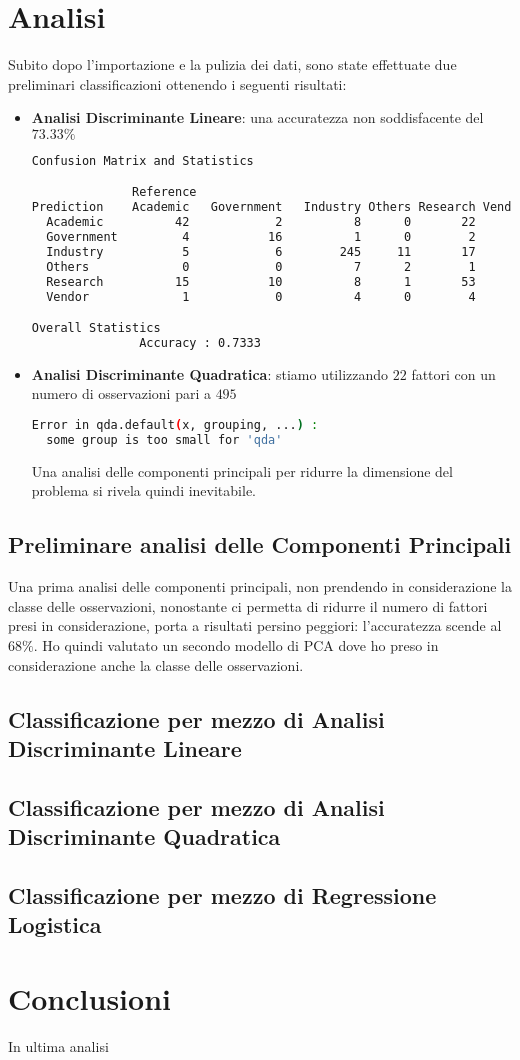 \documentclass[11pt,a4paper]{article}
\begin{document}
\section{Analisi}
Subito dopo l'importazione e la pulizia dei dati, sono state effettuate due
preliminari classificazioni ottenendo i seguenti risultati:
\begin{itemize}
	\item \textbf{Analisi Discriminante Lineare}: una accuratezza non
		soddisfacente del $73.33\%$
	\begin{lstlisting}[language=bash,basicstyle=\scriptsize,tabsize=2,frame = single]
Confusion Matrix and Statistics

              Reference
Prediction    Academic   Government   Industry Others Research Vendor
  Academic          42            2          8      0       22      2
  Government         4           16          1      0        2      0
  Industry           5            6        245     11       17      0
  Others             0            0          7      2        1      0
  Research          15           10          8      1       53      1
  Vendor             1            0          4      0        4      5

Overall Statistics
               Accuracy : 0.7333
	\end{lstlisting}
	\item \textbf{Analisi Discriminante Quadratica}: stiamo utilizzando $22$
		fattori con un numero di osservazioni pari a $495$
	\begin{lstlisting}[language=bash,basicstyle=\scriptsize,tabsize=2,frame = single]
Error in qda.default(x, grouping, ...) : 
  some group is too small for 'qda'
	\end{lstlisting}
		Una analisi delle componenti principali per ridurre la
		dimensione del problema si rivela quindi inevitabile.
\end{itemize}
\subsection{Preliminare analisi delle Componenti Principali}
Una prima analisi delle componenti principali, non prendendo in considerazione
la classe delle osservazioni, nonostante ci permetta di ridurre il numero di
fattori presi in considerazione, porta a risultati persino peggiori:
l'accuratezza scende al $68\%$. Ho quindi valutato un secondo modello di PCA
dove ho preso in considerazione anche la classe delle osservazioni.
\subsection{Classificazione per mezzo di Analisi Discriminante Lineare}
\subsection{Classificazione per mezzo di Analisi Discriminante Quadratica}
\subsection{Classificazione per mezzo di Regressione Logistica}
\section{Conclusioni}
In ultima analisi
\end{document}
